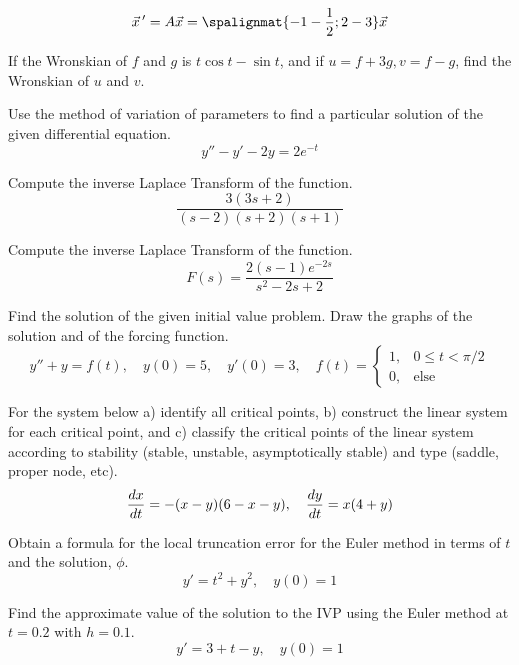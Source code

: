 \documentclass[12pt]{exam}
\begin{document}
\begin{questions}
    $$ \vec x \, ' = A \vec x = \spalignmat{-1 -\frac{1}{2}; 2 -3}\vec x$$

    \question[5] %
    If the Wronskian of $f$ and $g$ is $t \cos t−\sin t$, and if $u= f+3g, v=f-g$, find the Wronskian of $u$ and $v$. 


    
    \question[10] %
    Use the method of variation of parameters to find a particular solution of the given differential equation.
    $$y'' - y' -2y = 2e^{-t}$$
    
    \question[5] %
    Compute the inverse Laplace Transform of the function.
    $$\frac{3(3s+2)}{(s-2)(s+2)(s+1)}$$
    
    \question[5] %
    Compute the inverse Laplace Transform of the function.
    $$F(s) = \frac{2(s-1)e^{-2s}}{s^2-2s+2}$$
    
    \question[10] Find the solution of the given initial value problem. Draw the graphs of the solution and of the forcing function.
    $$y''+y=f(t), \quad y(0) = 5, \quad y'(0) = 3, \quad f(t) = \begin{cases} 1, & 0 \le t < \pi/2 \\ 0 , & \text{else} \end{cases}$$

    \question[10] %
    For the system below a) identify all critical points, b) construct the linear system for each critical point, and c) classify the critical points of the linear system according to stability (stable, unstable, asymptotically stable) and type (saddle, proper node, etc). 
    $${\frac{dx}{dt}} = -(x-y)(6-x-y), \quad {\frac{dy}{dt}} = x(4+y)$$
    
    \question[4] %
    Obtain a formula for the local truncation error for the Euler method in terms of $t$ and the solution, $\phi$. 
    $$y ' = t^2 + y^2, \quad y(0) = 1$$
    
    \question[4] %
    Find the approximate value of the solution to the IVP using the Euler method at $t = 0.2$ with $h = 0.1$. 
    $$y' = 3+t-y, \quad y(0) = 1$$
\end{questions}

\newpage
\end{document}
